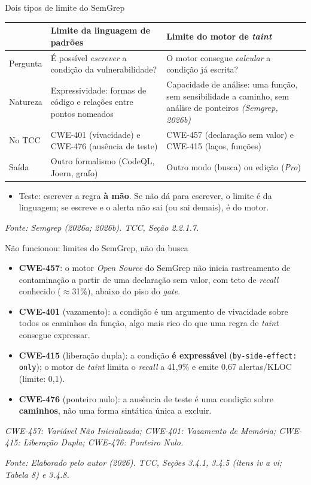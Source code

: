 \documentclass[
    aspectratio=169,
    12pt,
    brazil
]{beamer}
\newcommand{\fonte}[1]{{\tiny\itshape Fonte: #1\par}}
\newcommand{\cit}[1]{{\scriptsize\itshape (#1)}}
\begin{document}
\begin{frame}{Dois tipos de limite do SemGrep}
  \footnotesize
  \begin{center}
  \begin{tabular}{p{1.8cm}p{5.4cm}p{5.4cm}}
  \toprule
   & \textbf{Limite da linguagem de padrões} & \textbf{Limite do motor de \textit{taint}} \\
  \midrule
  Pergunta & É possível \textit{escrever} a condição da vulnerabilidade? & O motor consegue \textit{calcular} a condição já escrita? \\
  Natureza & Expressividade: formas de código e relações entre pontos nomeados & Capacidade de análise: uma função, sem sensibilidade a caminho, sem análise de ponteiros \cit{Semgrep, 2026b} \\
  No TCC & CWE-401 (vivacidade) e CWE-476 (ausência de teste) & CWE-457 (declaração sem valor) e CWE-415 (laços, funções) \\
  Saída & Outro formalismo (CodeQL, Joern, grafo) & Outro modo (busca) ou edição (\textit{Pro}) \\
  \bottomrule
  \end{tabular}
  \end{center}
  \begin{itemize}
    \item Teste: escrever a regra \textbf{à mão}. Se não dá para escrever, o limite é da linguagem; se escreve e o alerta não sai (ou sai demais), é do motor.
  \end{itemize}
  \vfill
  \fonte{Semgrep (2026a; 2026b). TCC, Seção 2.2.1.7.}
\end{frame}

\begin{frame}{Não funcionou: limites do SemGrep, não da busca}
  \begin{itemize}
    \small
    \item \textbf{CWE-457}: o motor \textit{Open Source} do SemGrep não inicia rastreamento de contaminação a partir de uma declaração sem valor, com teto de \textit{recall} conhecido ($\approx$31\%), abaixo do piso do \textit{gate}.
    \item \textbf{CWE-401} (vazamento): a condição é um argumento de vivacidade sobre todos os caminhos da função, algo mais rico do que uma regra de \textit{taint} consegue expressar.
    \item \textbf{CWE-415} (liberação dupla): a condição \textbf{é expressável} (\texttt{by-side-effect: only}); o motor de \textit{taint} limita o \textit{recall} a 41,9\% e emite 0,67 alertas/KLOC (limite: 0,1).
    \item \textbf{CWE-476} (ponteiro nulo): a ausência de teste é uma condição sobre \textbf{caminhos}, não uma forma sintática única a excluir.
  \end{itemize}
  \vspace{0.02cm}
  \vfill
  {\tiny\itshape CWE-457: Variável Não Inicializada; CWE-401: Vazamento de Memória; CWE-415: Liberação Dupla; CWE-476: Ponteiro Nulo.\par}
  \fonte{Elaborado pelo autor (2026). TCC, Seções 3.4.1, 3.4.5 (itens iv a vi; Tabela 8) e 3.4.8.}
\end{frame}
\end{document}
